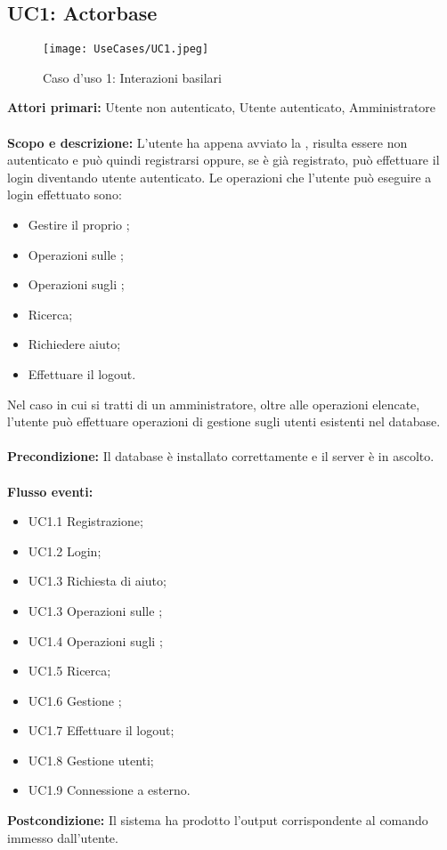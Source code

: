 \documentclass{scalatekids-article}
\begin{document}
\subsection{UC1: Actorbase}
\begin{figure}[H]
  \begin{center}
    \texttt{[image: UseCases/UC1.jpeg]}
    \caption{Caso d'uso 1: Interazioni basilari}
  \end{center}
\end{figure}
\textbf{Attori primari:} Utente non autenticato, Utente autenticato, Amministratore\\ \\
\textbf{Scopo e descrizione:}
L’utente ha appena avviato la , risulta essere non autenticato e può quindi
registrarsi oppure, se è già registrato, può effettuare il login diventando utente
autenticato. Le operazioni che l'utente può eseguire a login effettuato sono:
\begin{itemize}
\item Gestire il proprio ;
\item Operazioni sulle ;
\item Operazioni sugli ;
\item Ricerca;
\item Richiedere aiuto;
\item Effettuare il logout.
\end{itemize}
Nel caso in cui si tratti di un amministratore, oltre alle operazioni elencate, l'utente può effettuare operazioni di gestione sugli utenti
esistenti nel database.\\ \\
\textbf{Precondizione:} Il database è installato correttamente e il server è in ascolto.\\ \\
\textbf{Flusso eventi:}
\begin{itemize}
\item UC1.1 Registrazione;
\item UC1.2 Login;
\item UC1.3 Richiesta di aiuto;
\item UC1.3 Operazioni sulle ;
\item UC1.4 Operazioni sugli ;
\item UC1.5 Ricerca;
\item UC1.6 Gestione ;
\item UC1.7 Effettuare il logout;
\item UC1.8 Gestione utenti;
\item UC1.9 Connessione a  esterno.
\end{itemize}
\textbf{Postcondizione:} Il sistema ha prodotto l'output corrispondente al comando immesso dall'utente.
\end{document}
